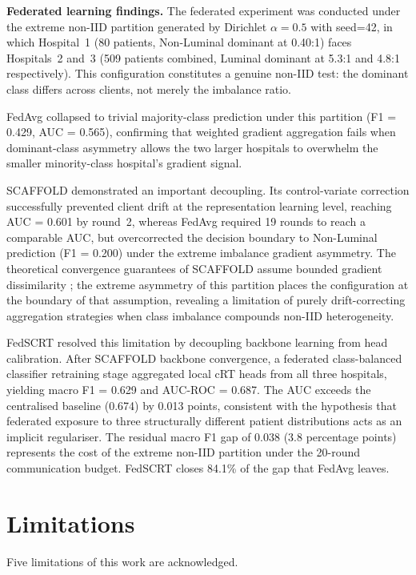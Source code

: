 \textbf{Federated learning findings.}
The federated experiment was conducted under the extreme
non-IID partition generated by Dirichlet $\alpha=0.5$ with
seed=42, in which Hospital~1 (80 patients, Non-Luminal
dominant at 0.40:1) faces Hospitals~2 and~3 (509 patients
combined, Luminal dominant at 5.3:1 and 4.8:1 respectively).
This configuration constitutes a genuine non-IID test:
the dominant class differs across clients, not merely the
imbalance ratio.

FedAvg collapsed to trivial majority-class prediction under
this partition (F1 = 0.429, AUC = 0.565), confirming that
weighted gradient aggregation fails when dominant-class
asymmetry allows the two larger hospitals to overwhelm
the smaller minority-class hospital's gradient signal.

SCAFFOLD demonstrated an important decoupling.
Its control-variate correction successfully prevented
client drift at the representation learning level,
reaching AUC = 0.601 by round~2, whereas FedAvg required
19 rounds to reach a comparable AUC, but overcorrected
the decision boundary to Non-Luminal prediction (F1 = 0.200)
under the extreme imbalance gradient asymmetry.
The theoretical convergence guarantees of SCAFFOLD assume
bounded gradient dissimilarity \cite{karimireddy2020scaffold};
the extreme asymmetry of this partition places the
configuration at the boundary of that assumption, revealing
a limitation of purely drift-correcting aggregation
strategies when class imbalance compounds non-IID
heterogeneity.

FedSCRT resolved this limitation by decoupling backbone
learning from head calibration.
After SCAFFOLD backbone convergence, a federated
class-balanced classifier retraining stage aggregated local
cRT heads from all three hospitals, yielding macro F1 = 0.629
and AUC-ROC = 0.687.
The AUC exceeds the centralised baseline (0.674) by 0.013
points, consistent with the hypothesis that federated
exposure to three structurally different patient
distributions acts as an implicit regulariser.
The residual macro F1 gap of 0.038 (3.8 percentage points)
represents the cost of the extreme non-IID partition under
the 20-round communication budget.
FedSCRT closes 84.1\% of the gap that FedAvg leaves.

\section*{Limitations}

Five limitations of this work are acknowledged.

